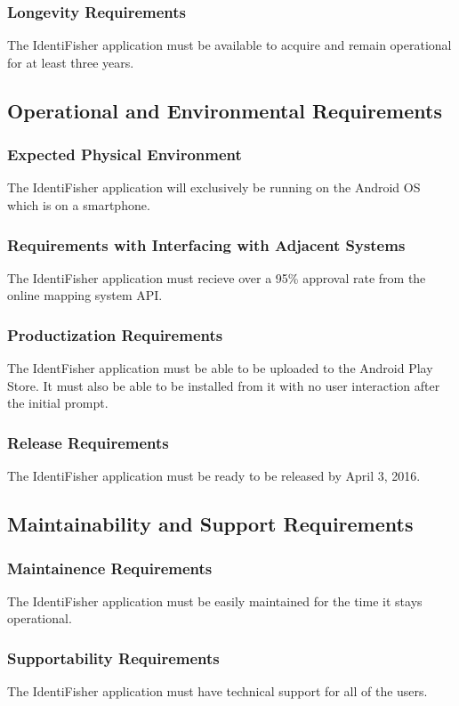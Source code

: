 \documentclass{article}
\begin{document}
\subsubsection{Longevity Requirements}
The IdentiFisher application must be available to acquire and remain operational for at least three years.

\subsection{Operational and Environmental Requirements}
\subsubsection{Expected Physical Environment}
The IdentiFisher application will exclusively be running on the Android OS which is on a smartphone.
\subsubsection{Requirements with Interfacing with Adjacent Systems}
The IdentiFisher application must recieve over a 95\% approval rate from the online mapping system API.
\subsubsection{Productization Requirements}
The IdentFisher application must be able to be uploaded to the Android Play Store. It must also be able to be installed from it with no user interaction after the initial prompt.
\subsubsection{Release Requirements}
The IdentiFisher application must be ready to be released by April 3, 2016.

\subsection{Maintainability and Support Requirements}
\subsubsection{Maintainence Requirements}
The IdentiFisher application must be easily maintained for the time it stays operational.
\subsubsection{Supportability Requirements}
The IdentiFisher application must have technical support for all of the users.
\end{document}
